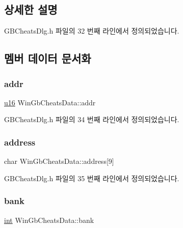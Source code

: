 \subsection{상세한 설명}


G\+B\+Cheats\+Dlg.\+h 파일의 32 번째 라인에서 정의되었습니다.



\subsection{멤버 데이터 문서화}
\mbox{\label{struct_win_gb_cheats_data_a80015100674ee2f689deb0f182ba6ca8}} 
\subsubsection{\texorpdfstring{addr}{addr}}
{\footnotesize\ttfamily \mbox{\hyperlink{_system_8h_a9e6c91d77e24643b888dbd1a1a590054}{u16}} Win\+Gb\+Cheats\+Data\+::addr}



G\+B\+Cheats\+Dlg.\+h 파일의 34 번째 라인에서 정의되었습니다.

\mbox{\label{struct_win_gb_cheats_data_a7d260c5c47f95346767df3da6838221c}} 
\subsubsection{\texorpdfstring{address}{address}}
{\footnotesize\ttfamily char Win\+Gb\+Cheats\+Data\+::address\mbox{[}9\mbox{]}}



G\+B\+Cheats\+Dlg.\+h 파일의 35 번째 라인에서 정의되었습니다.

\mbox{\label{struct_win_gb_cheats_data_a3cbfcdcf0184d58e83261e2238385480}} 
\subsubsection{\texorpdfstring{bank}{bank}}
{\footnotesize\ttfamily \mbox{\hyperlink{_util_8cpp_a0ef32aa8672df19503a49fab2d0c8071}{int}} Win\+Gb\+Cheats\+Data\+::bank}



